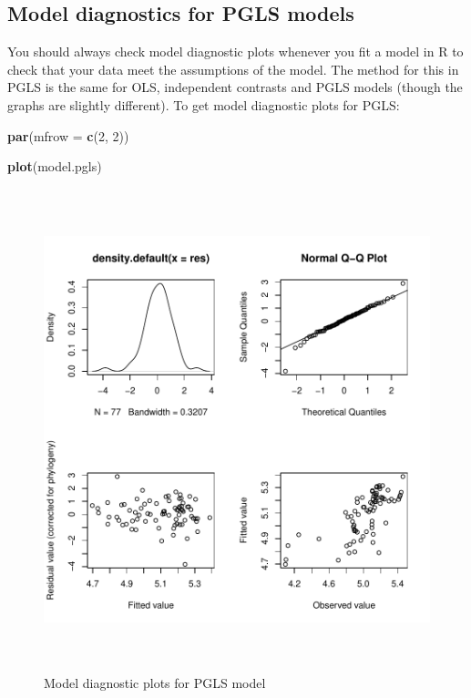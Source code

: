 \documentclass[12pt]{article}
\newcommand{\KeywordTok}[1]{\textcolor[rgb]{0.13,0.29,0.53}{\textbf{{#1}}}}
\newcommand{\DataTypeTok}[1]{\textcolor[rgb]{0.13,0.29,0.53}{{#1}}}
\newcommand{\DecValTok}[1]{\textcolor[rgb]{0.00,0.00,0.81}{{#1}}}
\newcommand{\NormalTok}[1]{{#1}}
\begin{document}
\newpage
\subsection{Model diagnostics for PGLS models}

You should always check model diagnostic plots whenever you fit a model in R to check that your data meet the assumptions of the model. The method for this in PGLS is the same for OLS, independent contrasts and PGLS models (though the graphs are slightly different). To get model diagnostic plots for PGLS:

\begin{snugshade}
\begin{Highlighting}[]
\KeywordTok{par}\NormalTok{(}\DataTypeTok{mfrow =} \KeywordTok{c}\NormalTok{(}\DecValTok{2}\NormalTok{, }\DecValTok{2}\NormalTok{))}

\KeywordTok{plot}\NormalTok{(model.pgls)}
\end{Highlighting}
\end{snugshade}

\begin{figure}[H]
\centering
\includegraphics[width = 40cm, height = 14cm, keepaspectratio=true]{Diagnosticplot.pdf}
\caption{Model diagnostic plots for PGLS model}
\label{figure}
\end{figure}
\end{document}
